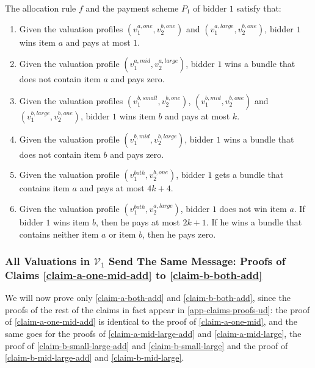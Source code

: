\begin{lemma}\label{lemma-small-pay-add}
    The allocation rule $f$ and the payment scheme $P_1$ of bidder $1$ satisfy that:
    \begin{enumerate}
        \item Given the valuation profiles $(v_1^{a,one},v_{2}^{b,one})$ and $(v_1^{a,large},v_{2}^{b,one})$, bidder $1$ wins item $a$ and pays at most $1$.  \label{item-1-add}
        \item  Given the valuation profile $(v_1^{a,mid},v_2^{a,large})$, bidder $1$ wins a bundle that does not contain item $a$ and pays zero.   \label{item-2-add}
        \item Given the valuation profiles $(v_1^{b,small},v_2^{b,one})$,
        $(v_1^{b,mid},v_2^{b,one})$ and $(v_1^{b,large},v_2^{b,one})$,  
        bidder $1$ wins item $b$ and pays at most $k$. 
        \label{item-4-add}
           \item  Given the valuation profile $(v_1^{b,mid},v_2^{b,large})$, bidder $1$ wins a bundle that does not contain item $b$ and pays zero.   \label{item-4.5-add}
\item Given the valuation profile $(v_1^{both},v_2^{b,one})$, 
bidder $1$ gets a bundle that contains item $a$ and pays at most $4k+4$. \label{item-6-add}
\item Given the valuation profile $(v_1^{both},v_2^{a,large})$, bidder $1$ does not win item $a$.  If bidder $1$ wins item $b$, then he pays at most $2k+1$. If he wins a bundle that contains neither item $a$ or item $b$, then he pays zero. \label{item-complicated-add}
    \end{enumerate}
\end{lemma}
\subsubsection[All Valuations in V\_1 Send The Same Message: Proofs of Claims \ref{claim-a-one-mid-add} to \ref{claim-b-both-add}]{All Valuations in $\mathcal V_1$ Send The Same Message: Proofs of Claims \ref{claim-a-one-mid-add} to \ref{claim-b-both-add}}\label{app-claims-proofs-add}
We will now prove only \cref{claim-a-both-add} and \cref{claim-b-both-add}, since the proofs of the rest of the claims in fact appear in \cref{app-claims-proofs-ud}: the proof of \cref{claim-a-one-mid-add} is identical to the proof of \cref{claim-a-one-mid}, and the same goes for the proofs of  \cref{claim-a-mid-large-add} and \cref{claim-a-mid-large}, 
the proof of \cref{claim-b-small-large-add} and  \cref{claim-b-small-large} and the proof of \cref{claim-b-mid-large-add} and \cref{claim-b-mid-large}.

